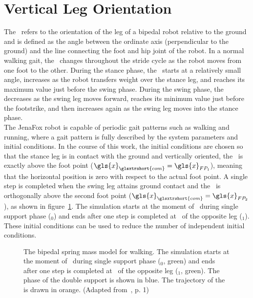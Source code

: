 \section{Vertical Leg Orientation}
\label{sec:vlo}

    The~ refers to the orientation of the leg of a bipedal robot relative to the ground and is defined as the angle between the ordinate axis (perpendicular to the ground) and the line connecting the foot and hip joint of the robot. In a normal walking gait, the~ changes throughout the stride cycle as the robot moves from one foot to the other. During the stance phase, the~ starts at a relatively small angle, increases as the robot transfers weight over the stance leg, and reaches its maximum value just before the swing phase. During the swing phase, the~ decreases as the swing leg moves forward, reaches its minimum value just before the footstrike, and then increases again as the swing leg moves into the stance phase.~\cite{Rummel2010}\\
    
    The JenaFox robot is capable of periodic gait patterns such as walking and running, where a gait pattern is fully described by the system parameters and initial conditions. In the course of this work, the initial conditions are chosen so that the stance leg is in contact with the ground and vertically oriented, \ie the~ is exactly above the foot point ($\gls{x}_{\glsxtrshort{com}} = \gls{x}_{FP_1}$), meaning that the horizontal position is zero with respect to the actual foot point. A single step is completed when the swing leg attains ground contact and the~ is orthogonally above the second foot point ($\gls{x}_{\glsxtrshort{com}} = \gls{x}_{FP_2}$), as shown in figure~\ref{fig:vlo}. The simulation starts at the moment of~ during single support phase ($_0$) and ends after one step is completed at~ of the opposite leg ($_1$). These initial conditions can be used to reduce the number of independent initial conditions.~\cite{Rummel2010}

    \begin{figure}[htb]%
        \centering%
        
        \caption{The bipedal spring mass model for walking. The simulation starts at the moment of~ during single support phase ($_0$, green) and ends after one step is completed at~ of the opposite leg ($_1$, green). The phase of the double support is shown in blue. The trajectory of the~ is drawn in orange. (Adapted from~\cite{Rummel2010}, p. 1)}%
        \label{fig:vlo}%
    \end{figure}%

